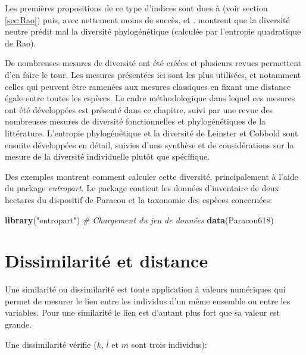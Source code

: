 \documentclass[
  11pt,
  french,
  a4paper,
  extrafontsizes,onecolumn,openright
  ]{memoir}
\newenvironment{Shaded}{\begin{snugshade}}{\end{snugshade}}
\newcommand{\CommentTok}[1]{\textcolor[rgb]{0.56,0.35,0.01}{\textit{#1}}}
\newcommand{\KeywordTok}[1]{\textcolor[rgb]{0.13,0.29,0.53}{\textbf{#1}}}
\newcommand{\NormalTok}[1]{#1}
\newcommand{\StringTok}[1]{\textcolor[rgb]{0.31,0.60,0.02}{#1}}
\begin{document}
Les premières propositions de ce type d'indices sont dues à \textcite{Rao1982} (voir section \ref{sec:Rao}) puis, avec nettement moins de succès, \textcite{Vane-Wright1991} et \textcite{Warwick1995}.
\textcite{Chave2007} montrent que la diversité neutre prédit mal la diversité phylogénétique (calculée par l'entropie quadratique de Rao).

De nombreuses mesures de diversité ont été créées et plusieurs revues permettent d'en faire le tour. \autocite{Ricotta2007,Vellend2010}
Les mesures présentées ici sont les plus utilisées, et notamment celles qui peuvent être ramenées aux mesures classiques en fixant une distance égale entre toutes les espèces.
Le cadre méthodologique dans lequel ces mesures ont été développées est présenté dans ce chapitre, suivi par une revue des nombreuses mesures de diversité fonctionnelles et phylogénétiques de la littérature.
L'entropie phylogénétique et la diversité de Leinster et Cobbold sont ensuite développées en détail, suivies d'une synthèse et de considérations sur la mesure de la diversité individuelle plutôt que spécifique.

Des exemples montrent comment calculer cette diversité, principalement à l'aide du package \emph{entropart}.
Le package contient les données d'inventaire de deux hectares du dispositif de Paracou et la taxonomie des espèces concernées:

\scriptsize

\begin{Shaded}
\begin{Highlighting}[]
\KeywordTok{library}\NormalTok{(}\StringTok{"entropart"}\NormalTok{)}
\CommentTok{# Chargement du jeu de données}
\KeywordTok{data}\NormalTok{(Paracou618)}
\end{Highlighting}
\end{Shaded}

\normalsize

\hypertarget{dissimilarituxe9-et-distance}{%
\section{Dissimilarité et distance}\label{dissimilarituxe9-et-distance}}

Une similarité ou dissimilarité est toute application à valeurs numériques qui permet de mesurer le lien entre les individus d'un même ensemble ou entre les variables.
Pour une similarité le lien est d'autant plus fort que sa valeur est grande.

Une dissimilarité vérifie (\(k\), \(l\) et \(m\) sont trois individus):
\end{document}

